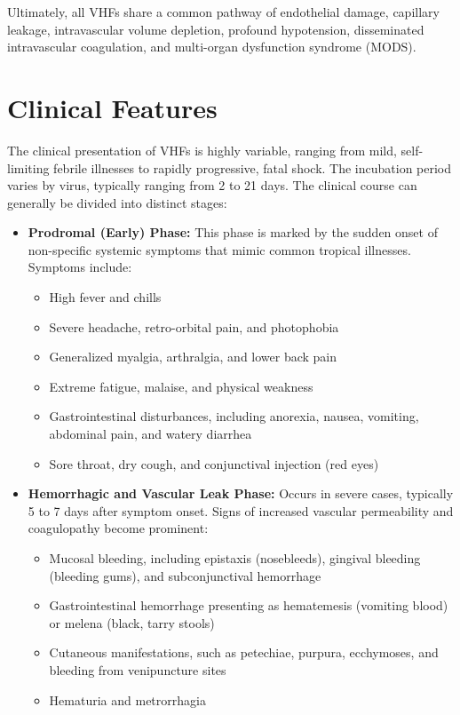Ultimately, all VHFs share a common pathway of endothelial damage, capillary leakage, intravascular volume depletion, profound hypotension, disseminated intravascular coagulation, and multi-organ dysfunction syndrome (MODS).

\section*{Clinical Features}
The clinical presentation of VHFs is highly variable, ranging from mild, self-limiting febrile illnesses to rapidly progressive, fatal shock. The incubation period varies by virus, typically ranging from 2 to 21 days. The clinical course can generally be divided into distinct stages:

\begin{itemize}
\item \textbf{Prodromal (Early) Phase:} This phase is marked by the sudden onset of non-specific systemic symptoms that mimic common tropical illnesses. Symptoms include:
  \begin{itemize}
  \item High fever and chills
  \item Severe headache, retro-orbital pain, and photophobia
  \item Generalized myalgia, arthralgia, and lower back pain
  \item Extreme fatigue, malaise, and physical weakness
  \item Gastrointestinal disturbances, including anorexia, nausea, vomiting, abdominal pain, and watery diarrhea
  \item Sore throat, dry cough, and conjunctival injection (red eyes)
  \end{itemize}
\item \textbf{Hemorrhagic and Vascular Leak Phase:} Occurs in severe cases, typically 5 to 7 days after symptom onset. Signs of increased vascular permeability and coagulopathy become prominent:
  \begin{itemize}
  \item Mucosal bleeding, including epistaxis (nosebleeds), gingival bleeding (bleeding gums), and subconjunctival hemorrhage
  \item Gastrointestinal hemorrhage presenting as hematemesis (vomiting blood) or melena (black, tarry stools)
  \item Cutaneous manifestations, such as petechiae, purpura, ecchymoses, and bleeding from venipuncture sites
  \item Hematuria and metrorrhagia

\end{itemize}
\end{itemize}
